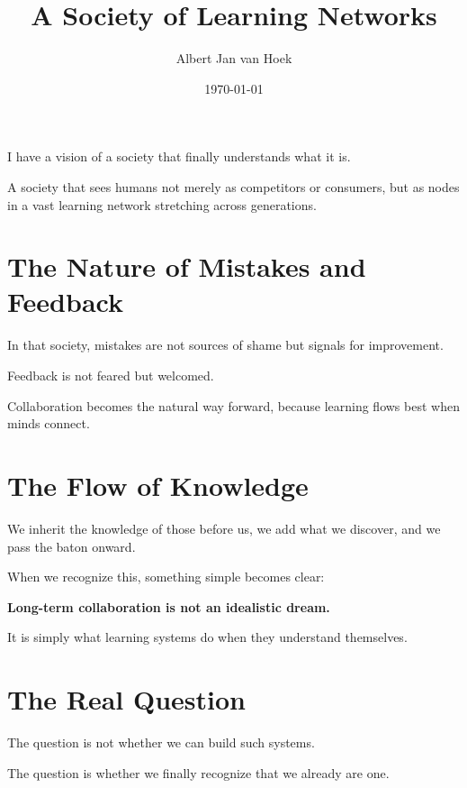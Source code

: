 \documentclass{article}
\title{A Society of Learning Networks}
\author{Albert Jan van Hoek}
\date{\today}
\begin{document}
\maketitle

I have a vision of a society that finally understands what it is.

A society that sees humans not merely as competitors or consumers, but as nodes in a vast learning network stretching across generations.

\section*{The Nature of Mistakes and Feedback}

In that society, mistakes are not sources of shame but signals for improvement.

Feedback is not feared but welcomed.

Collaboration becomes the natural way forward, because learning flows best when minds connect.

\section*{The Flow of Knowledge}

We inherit the knowledge of those before us, we add what we discover, and we pass the baton onward.

When we recognize this, something simple becomes clear:

\textbf{Long-term collaboration is not an idealistic dream.}

It is simply what learning systems do when they understand themselves.

\section*{The Real Question}

The question is not whether we can build such systems.

The question is whether we finally recognize that we already are one.
\end{document}
